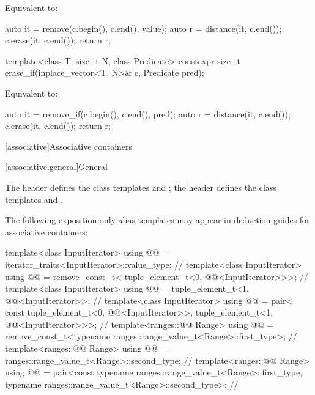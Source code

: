 \begin{itemdescr}
\pnum
\effects
Equivalent to:
\begin{codeblock}
auto it = remove(c.begin(), c.end(), value);
auto r = distance(it, c.end());
c.erase(it, c.end());
return r;
\end{codeblock}
\end{itemdescr}

%
\begin{itemdecl}
template<class T, size_t N, class Predicate>
  constexpr size_t erase_if(inplace_vector<T, N>& c, Predicate pred);
\end{itemdecl}

\begin{itemdescr}
\pnum
\effects
Equivalent to:
\begin{codeblock}
auto it = remove_if(c.begin(), c.end(), pred);
auto r = distance(it, c.end());
c.erase(it, c.end());
return r;
\end{codeblock}
\end{itemdescr}

[associative]{Associative containers}

[associative.general]{General}

\pnum
The header  defines the class templates
 and ;
the header  defines the class templates
 and .

\pnum
The following exposition-only alias templates may appear in deduction guides for associative containers:
\begin{codeblock}
template<class InputIterator>
  using @@ = iterator_traits<InputIterator>::value_type;   // \expos
template<class InputIterator>
  using @@ = remove_const_t<
    tuple_element_t<0, @@<InputIterator>>>;                // \expos
template<class InputIterator>
  using @@ =
    tuple_element_t<1, @@<InputIterator>>;                 // \expos
template<class InputIterator>
  using @@ = pair<
    const tuple_element_t<0, @@<InputIterator>>,
    tuple_element_t<1, @@<InputIterator>>>;                // \expos
template<ranges::@@ Range>
  using @@ =
    remove_const_t<typename ranges::range_value_t<Range>::first_type>;  // \expos
template<ranges::@@ Range>
  using @@ = ranges::range_value_t<Range>::second_type; // \expos
template<ranges::@@ Range>
  using @@ =
    pair<const typename ranges::range_value_t<Range>::first_type,
         typename ranges::range_value_t<Range>::second_type>;           // \expos
\end{codeblock}

